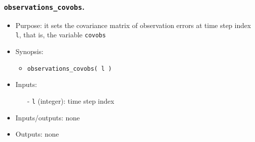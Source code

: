 \documentclass[12pt]{article}
\begin{document}
\subsubsection{{\tt observations\_covobs}.}
\begin{itemize}
\item Purpose: it sets the covariance matrix of observation errors at time step index {\tt l}, that is, the variable {\tt covobs}
\item Synopsis: 
\begin{itemize}
\item {\tt observations\_covobs( l )}
\end{itemize}
\item Inputs: 
\begin{itemize}
\item[-] {\tt l} (integer): time step index
\end{itemize}
\item Inputs/outputs: none
\item Outputs: none
\end{itemize} 

\end{document}
